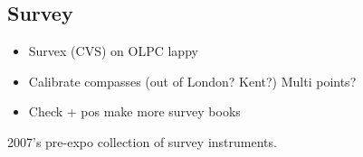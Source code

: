     \subsection{Survey}
        \begin{itemize}
            \item Survex (CVS) on OLPC lappy
            \item Calibrate compasses (out of London? Kent?) Multi points?
            \item Check + pos make more survey books
        \end{itemize}
\begin{marginfigure}
\checkoddpage \ifoddpage \forcerectofloat \else \forceversofloat \fi
\centering
 \caption{2007's pre-expo collection of survey instruments. }
 \label{survey collection 2009}
 \end{marginfigure}

